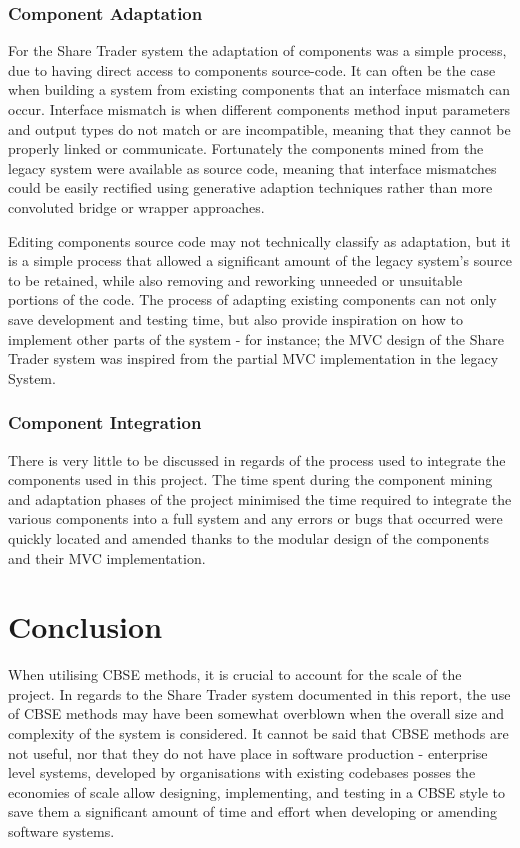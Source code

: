\documentclass[12pt, a4paper,titlepage]{article}
\begin{document}
\subsubsection{Component Adaptation}
For the Share Trader system the adaptation of components was a simple process,
due to having direct access to components source-code. 
It can often be the case when building a system from existing components that
an interface mismatch can occur. 
Interface mismatch is when different components method input parameters and
output types do not match or are incompatible, meaning that they cannot be
properly linked or communicate.  
Fortunately the components mined from the legacy system were available as
source code, meaning that interface mismatches could be easily rectified
using generative adaption techniques rather than more convoluted bridge or
wrapper approaches.

Editing components source code may not technically classify as adaptation, but
it is a simple process that allowed a significant amount of the legacy system's
source to be retained, while also removing and reworking unneeded or
unsuitable portions of the code. 
The process of adapting existing components can not only save development and
testing time, but also provide inspiration on how to implement other parts of
the system - for instance; the MVC design of the Share Trader system was
inspired from the partial MVC implementation in the legacy System.

\subsubsection{Component Integration}
There is very little to be discussed in regards of the process used to
integrate the components used in this project. 
The time spent during the component mining and adaptation phases of the
project minimised the time required to integrate the various components into a
full system and any errors or bugs that occurred were quickly located and
amended thanks to the modular design of the components and their MVC
implementation.


\section{Conclusion}
When utilising CBSE methods, it is crucial to
account for the scale of the project. 
In regards to the Share Trader system documented
in this report, the use of CBSE methods may have been somewhat overblown when
the overall size and complexity of the system is considered.  
It cannot be
said that CBSE methods are not useful, nor that they do not have place in
software production - enterprise level systems, developed by organisations
with existing codebases posses the economies of scale allow designing,
implementing, and testing in a CBSE style to save them a significant amount of
time and effort when developing or amending software systems. 
\end{document}
